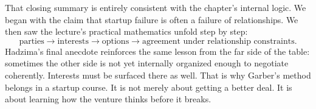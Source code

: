 That closing summary is entirely consistent with the chapter's internal logic. We began with the claim that startup failure is often a failure of relationships. We then saw the lecture's practical mathematics unfold step by step:
\[
\text{parties} \longrightarrow \text{interests} \longrightarrow \text{options} \longrightarrow \text{agreement under relationship constraints}.
\]
Hadzima's final anecdote reinforces the same lesson from the far side of the table: sometimes the other side is not yet internally organized enough to negotiate coherently. Interests must be surfaced there as well. That is why Garber's method belongs in a startup course. It is not merely about getting a better deal. It is about learning how the venture thinks before it breaks.